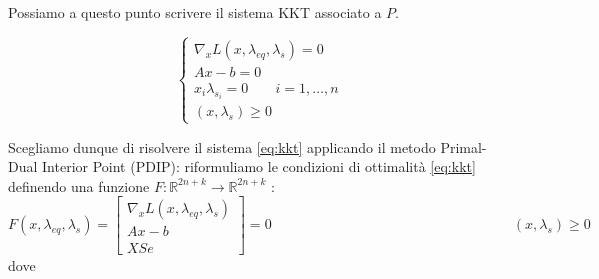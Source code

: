Possiamo a questo punto scrivere il sistema KKT associato a $P$.

\begin{equation} \label{eq:kkt}
    \begin{cases}\nabla _x L(x, \lambda_{eq}, \lambda_s) = 0 \\
        Ax - b = 0\\
        x_i  \lambda_{s_i} = 0 \;\;\;\;\;\;\; i = 1, \dots, n \\
        (x,\lambda_s) \geq 0
    \end{cases}
\end{equation}

\begin{comment}
\rightarrow
\begin{bmatrix}
\nabla _x L(x, \lambda_{eq}, \lambda_s)\\Ax - b\\XSe
\end{bmatrix}
=
\begin{bmatrix}
0\\ 0 \\0
\end{bmatrix}
\rightarrow
\begin{bmatrix}
2Q & A^\intercal & -I\\
A & 0 & 0 \\
S & 0 & X
\end{bmatrix}
\;
\begin{bmatrix}
x \\ \lambda_{eq} \\ \lambda_s
\end{bmatrix}
=
\begin{bmatrix}
-q\\ b \\ 0
\end{bmatrix}
\end{comment}

Scegliamo dunque di risolvere il sistema \ref{eq:kkt} applicando il metodo Primal-Dual Interior Point (PDIP): riformuliamo le condizioni di ottimalità \ref{eq:kkt} 
definendo una funzione $F : \mathbb{R}^{2n+k} \rightarrow \mathbb{R}^{2n+k}$ \cite{Nocedal2006Numerical}:
\begin{subequations}
\begin{equation} \label{eq:F}
F(x, \lambda_{eq}, \lambda_s)=
\begin{bmatrix}
\nabla _x L(x, \lambda_{eq}, \lambda_s)\\Ax - b\\XSe
\end{bmatrix}
=0
\end{equation}
\begin{equation} \label{eq:nonneg}
\;\;\;\;\;\;\;\;\;\;\;\;\;\;\;\;\;\;\;\;\;\;\;\;\;\;\;\;\;\;\;\;\;\;\;\;\;\;\;\;\;\;\;\;\;\;\;\;\;\;\;\;\;\;\;\;\;\;\;\;\;\;(x,\lambda_s)\geq 0
\end{equation}
\end{subequations}
dove


